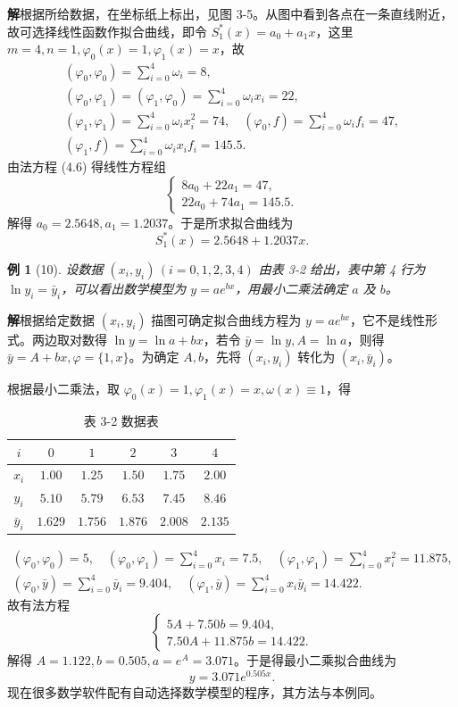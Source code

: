 \documentclass[a4paper,12pt]{ctexart}
\theoremstyle{exampleStyle}
\newtheorem*{example}{例}
\newcommand{\solution}{\par\noindent\textbf{解}\quad}
\begin{document}
\solution 根据所给数据，在坐标纸上标出，见图 3-5。从图中看到各点在一条直线附近，故可选择线性函数作拟合曲线，即令 $S_1^*(x) = a_0 + a_1 x$，这里 $m=4, n=1, \varphi_0(x) = 1, \varphi_1(x) = x$，故
\begin{gather*}
(\varphi_0, \varphi_0) = \sum_{i=0}^4 \omega_i = 8, \\
(\varphi_0, \varphi_1) = (\varphi_1, \varphi_0) = \sum_{i=0}^4 \omega_i x_i = 22, \\
(\varphi_1, \varphi_1) = \sum_{i=0}^4 \omega_i x_i^2 = 74, \quad (\varphi_0, f) = \sum_{i=0}^4 \omega_i f_i = 47, \\
(\varphi_1, f) = \sum_{i=0}^4 \omega_i x_i f_i = 145.5.
\end{gather*}
由法方程 (4.6) 得线性方程组
\[
\begin{cases}
8a_0 + 22a_1 = 47, \\
22a_0 + 74a_1 = 145.5.
\end{cases}
\]
解得 $a_0 = 2.5648, a_1 = 1.2037$。于是所求拟合曲线为
\[
S_1^*(x) = 2.5648 + 1.2037x.
\]

\begin{example}[10]
设数据 $(x_i, y_i) \, (i=0, 1, 2, 3, 4)$ 由表 3-2 给出，表中第 4 行为 $\ln y_i = \bar{y}_i$，可以看出数学模型为 $y = ae^{bx}$，用最小二乘法确定 $a$ 及 $b$。
\end{example}

\solution 根据给定数据 $(x_i, y_i)$ 描图可确定拟合曲线方程为 $y = ae^{bx}$，它不是线性形式。两边取对数得 $\ln y = \ln a + bx$，若令 $\bar{y} = \ln y, A = \ln a$，则得 $\bar{y} = A + bx, \varphi = \{1, x\}$。为确定 $A, b$，先将 $(x_i, y_i)$ 转化为 $(x_i, \bar{y}_i)$。

根据最小二乘法，取 $\varphi_0(x) = 1, \varphi_1(x) = x, \omega(x) \equiv 1$，得

\begin{table}[H]
\centering
\caption*{表 3-2 数据表}
\begin{tabular}{c c c c c c}
\toprule
$i$ & $0$ & $1$ & $2$ & $3$ & $4$ \\
\midrule
$x_i$ & $1.00$ & $1.25$ & $1.50$ & $1.75$ & $2.00$ \\
$y_i$ & $5.10$ & $5.79$ & $6.53$ & $7.45$ & $8.46$ \\
$\bar{y}_i$ & $1.629$ & $1.756$ & $1.876$ & $2.008$ & $2.135$ \\
\bottomrule
\end{tabular}
\end{table}

\begin{gather*}
(\varphi_0, \varphi_0) = 5, \quad (\varphi_0, \varphi_1) = \sum_{i=0}^4 x_i = 7.5, \quad (\varphi_1, \varphi_1) = \sum_{i=0}^4 x_i^2 = 11.875, \\
(\varphi_0, \bar{y}) = \sum_{i=0}^4 \bar{y}_i = 9.404, \quad (\varphi_1, \bar{y}) = \sum_{i=0}^4 x_i \bar{y}_i = 14.422.
\end{gather*}
故有法方程
\[
\begin{cases}
5A + 7.50b = 9.404, \\
7.50A + 11.875b = 14.422.
\end{cases}
\]
解得 $A = 1.122, b = 0.505, a = e^A = 3.071$。于是得最小二乘拟合曲线为
\[
y = 3.071e^{0.505x}.
\]
现在很多数学软件配有自动选择数学模型的程序，其方法与本例同。
\end{document}
